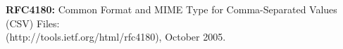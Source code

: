 \documentclass[11pt,oneside]{article}
\begin{document}
\begin{thebibliography}{X}
		
		
		 {\bf RFC4180:} {\sf Common Format and MIME Type for Comma-Separated Values (CSV) Files:}\\ (http://tools.ietf.org/html/rfc4180), October 2005. \vspace{-2mm}
		
	\end{thebibliography}
	
	
\end{document}
